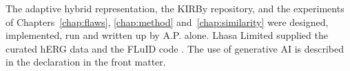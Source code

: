 The adaptive hybrid representation, the KIRBy repository, and the experiments of Chapters~\ref{chap:flaws}, \ref{chap:method} and~\ref{chap:similarity} were designed, implemented, run and written up by A.P. alone. Lhasa Limited supplied the curated hERG data and the FLuID code \citep{Hanser2025}. The use of generative AI is described in the declaration in the front matter.
